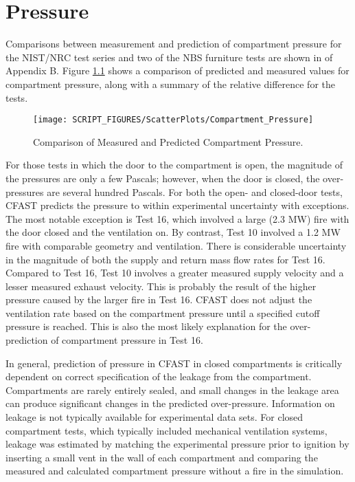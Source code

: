 \chapter{Pressure}

Comparisons between measurement and prediction of compartment pressure for the NIST/NRC test series and two of the NBS furniture tests are shown in of Appendix B.  Figure \ref{fig:Pressure_Scatter} shows a comparison of predicted and measured values for compartment pressure, along with a summary of the relative difference for the tests.
\label{Compartment Over-Pressure}

\begin{figure}
\begin{center}
\texttt{[image: SCRIPT\_FIGURES/ScatterPlots/Compartment\_Pressure]}  \\
\end{center}
\caption{Comparison of Measured and Predicted Compartment Pressure.} \label{fig:Pressure_Scatter}
\end{figure}

For those tests in which the door to the compartment is open, the magnitude of the pressures are only a few Pascals; however, when the door is closed, the over-pressures are several hundred Pascals.  For both the open- and closed-door tests, CFAST predicts the pressure to within experimental uncertainty with exceptions.  The most notable exception is Test 16, which involved a large (2.3 MW) fire with the door closed and the ventilation on.  By contrast, Test 10 involved a 1.2 MW fire with comparable geometry and ventilation.  There is considerable uncertainty in the magnitude of both the supply and return mass flow rates for Test 16.  Compared to Test 16, Test 10 involves a greater measured supply velocity and a lesser measured exhaust velocity.  This is probably the result of the higher pressure caused by the larger fire in Test 16.  CFAST does not adjust the ventilation rate based on the compartment pressure until a specified cutoff pressure is reached.  This is also the most likely explanation for the over-prediction of compartment pressure in Test 16.

In general, prediction of pressure in CFAST in closed compartments is critically dependent on correct specification of the leakage from the compartment.  Compartments are rarely entirely sealed, and small changes in the leakage area can produce significant changes in the predicted over-pressure. Information on leakage is not typically available for experimental data sets. For closed compartment tests, which typically included mechanical ventilation systems, leakage was estimated by matching the experimental pressure prior to ignition by inserting a small vent in the wall of each compartment and comparing the measured and calculated compartment pressure without a fire in the simulation.


